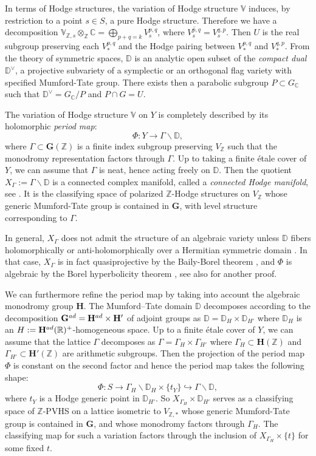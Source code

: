 \documentclass[10pt,letterpaper,english,reqno]{amsart}
\numberwithin{equation}{subsection}
\newcommand\C{{\mathbb C}}
\newcommand\bD{{\mathbb D}}
\newcommand\R{{\mathbb R}}
\newcommand\bV{{\mathbb V}}
\newcommand\Z{{\mathbb Z}}
\newcommand\bfG{{\mathbf G}}
\newcommand\bfH{{\mathbf H}}
\theoremstyle{definition}
\begin{document}
In terms of Hodge structures, the variation of Hodge structure $\bV$ induces, by restriction to a point $s\in S$, a pure Hodge structure. Therefore we have a decomposition $\bV_{\Z,s}\otimes_{\Z} \C=\bigoplus_{p+q=k}V^{p,q}_s$, where $\overline{V^{p,q}_s}=V^{q,p}_s$. Then $U$ is the real subgroup preserving each $V^{p,q}_*$ and the Hodge 
pairing between $V^{p,q}_*$ and $V^{q,p}_*$.
From the theory of symmetric spaces, $\bD$ is an analytic 
open subset of the {\it compact dual} $\bD^\vee$, a 
projective subvariety of a symplectic or an orthogonal flag 
variety with specified Mumford-Tate group. There exists then a parabolic subgroup $P\subset G_\C$ such that
$\bD^\vee = G_\C/P$ and $P\cap G = U$.
\medskip

The variation of Hodge structure $\bV$ on $Y$ is 
completely described by its holomorphic \emph{period map}: 
\[\Phi:Y\rightarrow \Gamma\backslash \bD,\]
where $\Gamma\subset \bfG(\Z)$ is a finite index subgroup 
preserving $V_\Z$ such that the monodromy representation 
factors through $\Gamma$. Up to taking a finite \'etale cover 
of $Y$, we can assume that $\Gamma$ is neat, hence acting 
freely on $\bD$. Then the quotient $X_\Gamma:=\Gamma\backslash \bD$ is a 
connected complex manifold, called a \emph{connected Hodge manifold}, see 
\cite[Definiton 3.18]{klingler-survey}. It is the 
classifying space of polarized $\Z$-Hodge
structures on  $V_\Z$ whose generic Mumford-Tate group is 
contained in $\bfG$, with level structure corresponding
to $\Gamma$.

In general, $X_\Gamma$ does not admit the structure
of an algebraic variety unless 
$\bD$ fibers holomorphically or anti-holomorphically over a Hermitian symmetric domain \cite{griffiths-robles}. In that case,
$X_\Gamma$ is in fact quasiprojective by 
the Baily-Borel theorem \cite{bailyborel}, and $\Phi$ is 
algebraic by the Borel hyperbolicity theorem 
\cite{borelmetric}, see also 
\cite{bakker-brunebarbe-tsimerman} for another proof.


We can furthermore refine the period map by taking into 
account the algebraic monodromy group $\bfH$. The Mumford--Tate domain $\bD$ decomposes according to the 
decomposition 
$\bfG^{\rm ad}=\bfH^{\rm ad}\times \bfH'$ of adjoint groups as 
$\bD=\bD_H\times \bD_{H'}$ where $\bD_H$ is an 
$H:=\bfH^{\rm ad}(\R)^{+}$-homogeneous space. Up to a finite 
\'etale cover of $Y$, we can assume that the lattice $\Gamma$ 
decomposes as $\Gamma=\Gamma_{H}\times \Gamma_{H'}$ 
where $\Gamma_{H}\subset \bfH(\Z)$ and 
$\Gamma_{H'}\subset \bfH'(\Z)$ are arithmetic subgroups. 
Then the projection of the period map $\Phi$ is constant on 
the second factor and hence the period map takes the 
following shape: 
\[\Phi:S\rightarrow \Gamma_H\backslash \bD_H\times 
\{t_Y\}\hookrightarrow \Gamma\backslash \bD,\]
where $t_Y$ is a Hodge generic point in $\bD_{H'}$. 
So $X_{\Gamma_H}\times \bD_{H'}$ serves as a
classifying space of $\Z$-PVHS on a lattice isometric to $V_{\Z,*}$ whose generic Mumford-Tate group is contained in $\bfG$, and whose monodromy factors through $\Gamma_H$. The classifying map for
such a variation factors through the inclusion of $X_{\Gamma_H}\times \{t\}$ for some fixed $t$.
\end{document}
